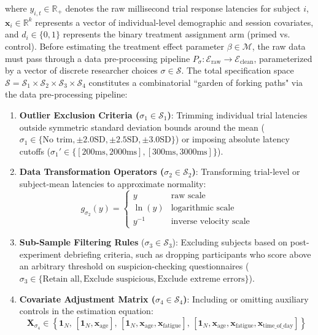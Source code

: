 \documentclass{article}
\theoremstyle{definition}
\begin{document}
\noindent
where $y_{i,t} \in \mathbb{R}_+$ denotes the raw millisecond trial response latencies for subject $i$, $\mathbf{x}_i \in \mathbb{R}^k$ represents a vector of individual-level demographic and session covariates, and $d_i \in \{0, 1\}$ represents the binary treatment assignment arm (primed vs. control). Before estimating the treatment effect parameter $\beta \in \mathcal{M}$, the raw data must pass through a data pre-processing pipeline $P_\sigma: \mathcal{E}_{\text{raw}} \to \mathcal{E}_{\text{clean}}$, parameterized by a vector of discrete researcher choices $\sigma \in \mathcal{S}$. The total specification space $\mathcal{S} = \mathcal{S}_1 \times \mathcal{S}_2 \times \mathcal{S}_3 \times \mathcal{S}_4$ constitutes a combinatorial ``garden of forking paths" via the data pre-processing pipeline:

\begin{enumerate}
    \item \textbf{Outlier Exclusion Criteria ($\sigma_1 \in \mathcal{S}_1$)}: Trimming individual trial latencies outside symmetric standard deviation bounds around the mean ($\sigma_1 \in \{\text{No trim}, \pm 2.0\text{SD}, \pm 2.5\text{SD}, \pm 3.0\text{SD}\}$) or imposing absolute latency cutoffs ($\sigma_1' \in \{[200\text{ms}, 2000\text{ms}], [300\text{ms}, 3000\text{ms}]\}$).

    \item \textbf{Data Transformation Operators ($\sigma_2 \in \mathcal{S}_2$)}: Transforming trial-level or subject-mean latencies to approximate normality:$$g_{\sigma_2}(y) = \begin{cases}     y & \text{raw scale} \\     \ln(y) & \text{logarithmic scale} \\     y^{-1} & \text{inverse velocity scale}     \end{cases}$$

    \item \textbf{Sub-Sample Filtering Rules} ($\sigma_3 \in \mathcal{S}_3$): Excluding subjects based on post-experiment debriefing criteria, such as dropping participants who score above an arbitrary threshold on suspicion-checking questionnaires ($\sigma_3 \in \{\text{Retain all}, \text{Exclude suspicious}, \text{Exclude extreme errors}\}$).

    \item \textbf{Covariate Adjustment Matrix ($\sigma_4 \in \mathcal{S}_4$)}: Including or omitting auxiliary controls in the estimation equation:$$\mathbf{X}_{\sigma_4} \in \left\{ \mathbf{1}_N, \, [\mathbf{1}_N, \mathbf{x}_{\text{age}}], \, [\mathbf{1}_N, \mathbf{x}_{\text{age}}, \mathbf{x}_{\text{fatigue}}], \, [\mathbf{1}_N, \mathbf{x}_{\text{age}}, \mathbf{x}_{\text{fatigue}}, \mathbf{x}_{\text{time\_of\_day}}] \right\}$$
\end{enumerate}
\end{document}
